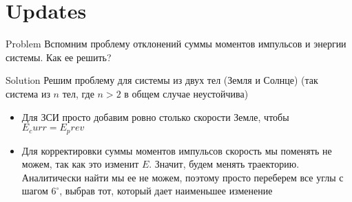\documentclass{beamer}
\begin{document}
\section{Updates}

\begin{frame}[fragile]{Problem}
  Вспомним проблему отклонений суммы моментов импульсов и энергии системы. Как ее решить?
\end{frame}

\begin{frame}[fragile]{Solution}
  Решим проблему для системы из двух тел (Земля и Солнце) (так система из $n$ тел, где $n > 2$ в общем случае неустойчива)
  \begin{itemize}
    \item <2-> Для ЗСИ просто добавим ровно столько скорости Земле, чтобы $E_curr = E_prev$
    \item <3-> Для корректировки суммы моментов импульсов скорость мы поменять не можем, так
    как это изменит $E$. Значит, будем менять траекторию. Аналитически найти мы ее не можем, поэтому
    просто переберем все углы с шагом $6^\circ$, выбрав тот, который дает наименьшее изменение
  \end{itemize}
\end{frame}
\end{document}
